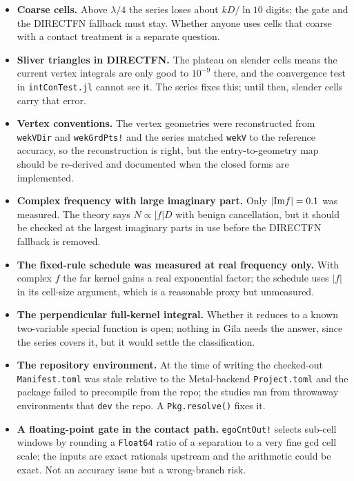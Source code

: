 \documentclass[11pt]{article}
\theoremstyle{remark}
\newcommand{\code}[1]{\texttt{#1}}
\begin{document}
\begin{itemize}[nosep]
\item \textbf{Coarse cells.} Above $\lambda/4$ the series loses about $kD/\ln 10$
digits; the gate and the DIRECTFN fallback must stay. Whether anyone uses cells that
coarse with a contact treatment is a separate question.
\item \textbf{Sliver triangles in DIRECTFN.} The plateau on slender cells means the
current vertex integrals are only good to $10^{-9}$ there, and the convergence test
in \code{intConTest.jl} cannot see it. The series fixes this; until then, slender
cells carry that error.
\item \textbf{Vertex conventions.} The vertex geometries were reconstructed from
\code{wekVDir} and \code{wekGrdPts!} and the series matched \code{wekV} to the
reference accuracy, so the reconstruction is right, but the entry-to-geometry map
should be re-derived and documented when the closed forms are implemented.
\item \textbf{Complex frequency with large imaginary part.} Only $|{\rm Im} f| = 0.1$
was measured. The theory says $N\propto|f|D$ with benign cancellation, but it should
be checked at the largest imaginary parts in use before the DIRECTFN fallback is
removed.
\item \textbf{The fixed-rule schedule was measured at real frequency only.} With
complex $f$ the far kernel gains a real exponential factor; the schedule uses $|f|$ in
its cell-size argument, which is a reasonable proxy but unmeasured.
\item \textbf{The perpendicular full-kernel integral.} Whether it reduces to a known
two-variable special function is open; nothing in Gila needs the answer, since the
series covers it, but it would settle the classification.
\item \textbf{The repository environment.} At the time of writing the checked-out
\code{Manifest.toml} was stale relative to the Metal-backend \code{Project.toml} and
the package failed to precompile from the repo; the studies ran from throwaway
environments that \code{dev} the repo. A \code{Pkg.resolve()} fixes it.
\item \textbf{A floating-point gate in the contact path.} \code{egoCntOut!} selects
sub-cell windows by rounding a \code{Float64} ratio of a separation to a very fine gcd
cell scale; the inputs are exact rationals upstream and the arithmetic could be exact.
Not an accuracy issue but a wrong-branch risk.
\end{itemize}
\end{document}
